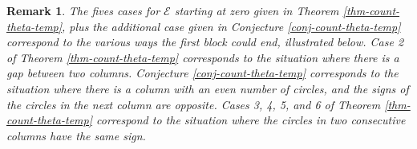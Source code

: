 \documentclass[11pt,letterpaper]{amsart}
\newcommand{\EE}{\mathcal{E}}
\newtheorem{rmk}[thm]{Remark}
\numberwithin{equation}{section}
\begin{document}
\begin{rmk}
    The fives cases for $\EE$ starting at zero given  in Theorem \ref{thm-count-theta-temp}, plus the additional case given in Conjecture \ref{conj-count-theta-temp} correspond to the various ways the first block could end, illustrated below. Case 2 of Theorem \ref{thm-count-theta-temp} corresponds to the situation where there is a gap between two columns. Conjecture \ref{conj-count-theta-temp}  corresponds to the situation where there is a column with an even number of circles, and the signs of the circles in the next column are opposite. Cases 3, 4, 5, and 6 of Theorem \ref{thm-count-theta-temp} correspond to the situation where the circles in two consecutive columns have the same sign. 

    \begin{center}
\end{center}
\end{rmk}
\end{document}
